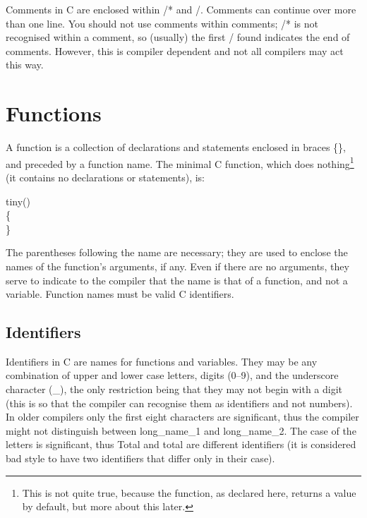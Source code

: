 Comments in  C are  enclosed within  {\cd /*} and {\cd */}.  Comments
can continue over more than one line. You should not use comments within
comments; {\cd /*} is not recognised within a comment,
so (usually) the first {\cd */} found indicates the end of comments. 
However, this is compiler dependent and not all compilers may act
this way.

\section{Functions}

A function  is a  collection of  {\kc declarations\/} and  {\kc
statements\/} enclosed in braces {\cd \{\}}, and preceded by a {\kc
function name}. The minimal C function, which does
nothing\footnote{This is not quite true, because the function, as
declared here, returns a value by default, but more about this
later.} (it contains no declarations or statements), is:
\begin{code}
 tiny() \\
 \{ \\
 \}
\end{code}
\noindent
 The parentheses  following the  name are  necessary;  they  are  used
to enclose the  names of  the function's  arguments, if any. Even if
there are no arguments, they  serve to  indicate to the compiler that
the name is that of a function, and not a variable. Function names
must be valid C {\kc identifiers\/}.

     

\subsection{Identifiers}

     Identifiers in  C are  names for functions and variables. They
may be any combination  of  upper  and  lower  case letters, 
digits  (0--9),  and  the underscore character (\_), the only
restriction being that they may not begin with a  digit (this  is so
that the compiler can recognise them as identifiers and not numbers).
In older compilers only the first eight characters are significant, thus the
compiler  might not  distinguish between  {\cd long\_name\_1} and  
{\cd long\_name\_2}. The case of the letters is significant,  thus 
{\cd Total}  and  {\cd total}  are  different identifiers (it  is
considered  bad style  to have two identifiers that differ only in
their case).

